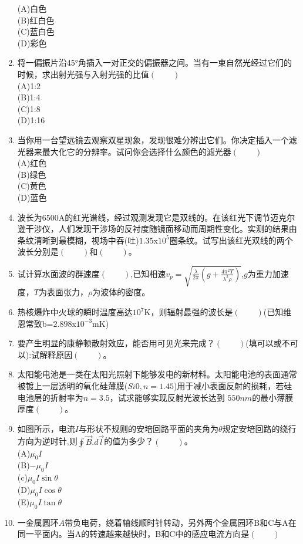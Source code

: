 \begin{enumerate}
(A)白色\\
(B)红白色\\
(C)蓝白色\\
(D)彩色
\item 将一偏振片沿45°角插入一对正交的偏振器之间。当有一束自然光经过它们的时候，求出射光强与入射光强的比值$(\qquad)$\\
(A)1:2\\
(B)1:4\\
(C)1:8\\
(D)1:16
\item 当你用一台望远镜去观察双星现象，发现很难分辨出它们。你决定插入一个滤光器来最大化它的分辨率。试问你会选择什么颜色的滤光器$(\qquad)$\\
(A)红色\\
(B)绿色\\
(C)黄色\\
(D)蓝色\\
\item 波长为6500A的红光谱线，经过观测发现它是双线的。在该红光下调节迈克尔逊干涉仪，人们发现干涉场的反衬度随镜面移动而周期性变化。实测的结果由条纹清晰到最模糊，视场中吞(吐)$1.35$x$10^5$圈条纹。试写出该红光双线的两个波长分别是$(\qquad)$和$(\qquad)$。
\item 试计算水面波的群速度$(\qquad)$,已知相速$\displaystyle v_p=\sqrt{\frac{\lambda}{2\pi}(g+\frac{4\pi ^2 T}{\lambda^2 \rho})}$,$g$为重力加速度，$T$为表面张力，$\rho$为波体的密度。
\item 热核爆炸中火球的瞬时温度高达$10^7$K，则辐射最强的波长是$(\qquad)$(已知维恩常致b=$2.898$x$10^{-3}$mK)
\item 要产生明显的康静顿散射效应，能否用可见光来完成？$(\qquad)$(填可以或不可以):试解释原因$(\qquad)$。
\item 太阳能电池是一类在太阳光照射下能够发电的新材料。太阳能电池的表面通常被镀上一层透明的氧化硅薄膜($Si0,n=1.45$)用于减小表面反射的损耗，若硅电池层的折射率为$n=3.5$，试求能够实现反射光波长达到 $550nm$的最小薄膜厚度$(\qquad)$。
\item 如图所示，电流$I$与形状不规则的安培回路平面的夹角为$\theta$规定安培回路的绕行方向为逆时针,则$\oint \vec B.d\vec l$的值为多少？$(\qquad)$。\\
(A)$\mu_0 I$\\
(B)$-\mu_0 I$\\
(c)$\mu_0 I \sin \theta $\\
(D)$\mu_0 I \cos \theta$\\
(E)$\mu_0 I \tan \theta$
\item 一金属圆环$A$带负电荷，绕着轴线顺时针转动，另外两个金属园环B和C与A在同一平面内。当A的转速越来越快时，B和C中的感应电流方向是$(\qquad)$\\

\end{enumerate}
